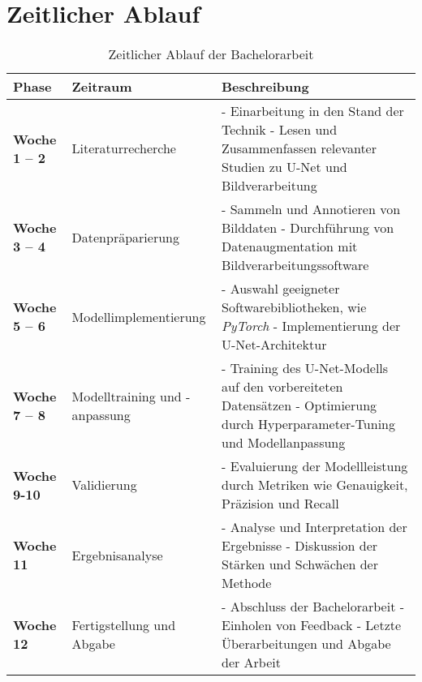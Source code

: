 \chapter{Zeitlicher Ablauf}\label{sec:exp_ablauf}
\begin{table}[h!]
    \centering
    \begin{tabular}{|p{3cm}|p{3cm}|p{8cm}|}
        \hline
        \textbf{Phase} & \textbf{Zeitraum} & \textbf{Beschreibung} \\
        \hline
        \textbf{Woche 1 – 2} & Literaturrecherche & 
        - Einarbeitung in den Stand der Technik \newline
        - Lesen und Zusammenfassen relevanter Studien zu U-Net und Bildverarbeitung \\
        \hline
        \textbf{Woche 3 – 4} & Datenpräparierung & 
        - Sammeln und Annotieren von Bilddaten \newline
        - Durchführung von Datenaugmentation mit Bildverarbeitungssoftware \\
        \hline
        \textbf{Woche 5 – 6} & Modellimplementierung & 
        - Auswahl geeigneter Softwarebibliotheken, wie \textit{PyTorch} \newline
        - Implementierung der U-Net-Architektur \\
        \hline
        \textbf{Woche 7 – 8} & Modelltraining und -anpassung & 
        - Training des U-Net-Modells auf den vorbereiteten Datensätzen \newline
        - Optimierung durch Hyperparameter-Tuning und Modellanpassung \\
        \hline
        \textbf{Woche 9-10} & Validierung & 
        - Evaluierung der Modellleistung durch Metriken wie Genauigkeit, Präzision und Recall \\
        \hline
        \textbf{Woche 11} & Ergebnisanalyse & 
        - Analyse und Interpretation der Ergebnisse \newline
        - Diskussion der Stärken und Schwächen der Methode \\
        \hline
        \textbf{Woche 12} & Fertigstellung und Abgabe & 
        - Abschluss der Bachelorarbeit \newline
        - Einholen von Feedback \newline
        - Letzte Überarbeitungen und Abgabe der Arbeit \\
        \hline
    \end{tabular}
    \caption{Zeitlicher Ablauf der Bachelorarbeit}
\end{table}